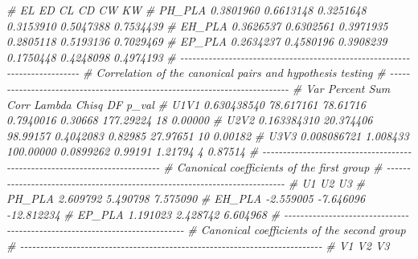 \documentclass[
]{book}
\newenvironment{Shaded}{\begin{snugshade}}{\end{snugshade}}
\newcommand{\CommentTok}[1]{\textcolor[rgb]{0.56,0.35,0.01}{\textit{#1}}}
\numberwithin{equation}{section}
\begin{document}
\begin{Shaded}
\begin{Highlighting}[]
\CommentTok{\#               EL        ED        CL        CD        CW        KW}
\CommentTok{\# PH\_PLA 0.3801960 0.6613148 0.3251648 0.3153910 0.5047388 0.7534439}
\CommentTok{\# EH\_PLA 0.3626537 0.6302561 0.3971935 0.2805118 0.5193136 0.7029469}
\CommentTok{\# EP\_PLA 0.2634237 0.4580196 0.3908239 0.1750448 0.4248098 0.4974193}
\CommentTok{\# {-}{-}{-}{-}{-}{-}{-}{-}{-}{-}{-}{-}{-}{-}{-}{-}{-}{-}{-}{-}{-}{-}{-}{-}{-}{-}{-}{-}{-}{-}{-}{-}{-}{-}{-}{-}{-}{-}{-}{-}{-}{-}{-}{-}{-}{-}{-}{-}{-}{-}{-}{-}{-}{-}{-}{-}{-}{-}{-}{-}{-}{-}{-}{-}{-}{-}{-}{-}{-}{-}{-}{-}{-}{-}{-}}
\CommentTok{\# Correlation of the canonical pairs and hypothesis testing }
\CommentTok{\# {-}{-}{-}{-}{-}{-}{-}{-}{-}{-}{-}{-}{-}{-}{-}{-}{-}{-}{-}{-}{-}{-}{-}{-}{-}{-}{-}{-}{-}{-}{-}{-}{-}{-}{-}{-}{-}{-}{-}{-}{-}{-}{-}{-}{-}{-}{-}{-}{-}{-}{-}{-}{-}{-}{-}{-}{-}{-}{-}{-}{-}{-}{-}{-}{-}{-}{-}{-}{-}{-}{-}{-}{-}{-}{-}}
\CommentTok{\#              Var   Percent       Sum      Corr  Lambda     Chisq DF   p\_val}
\CommentTok{\# U1V1 0.630438540 78.617161  78.61716 0.7940016 0.30668 177.29224 18 0.00000}
\CommentTok{\# U2V2 0.163384310 20.374406  98.99157 0.4042083 0.82985  27.97651 10 0.00182}
\CommentTok{\# U3V3 0.008086721  1.008433 100.00000 0.0899262 0.99191   1.21794  4 0.87514}
\CommentTok{\# {-}{-}{-}{-}{-}{-}{-}{-}{-}{-}{-}{-}{-}{-}{-}{-}{-}{-}{-}{-}{-}{-}{-}{-}{-}{-}{-}{-}{-}{-}{-}{-}{-}{-}{-}{-}{-}{-}{-}{-}{-}{-}{-}{-}{-}{-}{-}{-}{-}{-}{-}{-}{-}{-}{-}{-}{-}{-}{-}{-}{-}{-}{-}{-}{-}{-}{-}{-}{-}{-}{-}{-}{-}{-}{-}}
\CommentTok{\# Canonical coefficients of the first group }
\CommentTok{\# {-}{-}{-}{-}{-}{-}{-}{-}{-}{-}{-}{-}{-}{-}{-}{-}{-}{-}{-}{-}{-}{-}{-}{-}{-}{-}{-}{-}{-}{-}{-}{-}{-}{-}{-}{-}{-}{-}{-}{-}{-}{-}{-}{-}{-}{-}{-}{-}{-}{-}{-}{-}{-}{-}{-}{-}{-}{-}{-}{-}{-}{-}{-}{-}{-}{-}{-}{-}{-}{-}{-}{-}{-}{-}{-}}
\CommentTok{\#               U1        U2         U3}
\CommentTok{\# PH\_PLA  2.609792  5.490798   7.575090}
\CommentTok{\# EH\_PLA {-}2.559005 {-}7.646096 {-}12.812234}
\CommentTok{\# EP\_PLA  1.191023  2.428742   6.604968}
\CommentTok{\# {-}{-}{-}{-}{-}{-}{-}{-}{-}{-}{-}{-}{-}{-}{-}{-}{-}{-}{-}{-}{-}{-}{-}{-}{-}{-}{-}{-}{-}{-}{-}{-}{-}{-}{-}{-}{-}{-}{-}{-}{-}{-}{-}{-}{-}{-}{-}{-}{-}{-}{-}{-}{-}{-}{-}{-}{-}{-}{-}{-}{-}{-}{-}{-}{-}{-}{-}{-}{-}{-}{-}{-}{-}{-}{-}}
\CommentTok{\# Canonical coefficients of the second group }
\CommentTok{\# {-}{-}{-}{-}{-}{-}{-}{-}{-}{-}{-}{-}{-}{-}{-}{-}{-}{-}{-}{-}{-}{-}{-}{-}{-}{-}{-}{-}{-}{-}{-}{-}{-}{-}{-}{-}{-}{-}{-}{-}{-}{-}{-}{-}{-}{-}{-}{-}{-}{-}{-}{-}{-}{-}{-}{-}{-}{-}{-}{-}{-}{-}{-}{-}{-}{-}{-}{-}{-}{-}{-}{-}{-}{-}{-}}
\CommentTok{\#             V1         V2          V3}

\end{Highlighting}
\end{Shaded}
\end{document}
